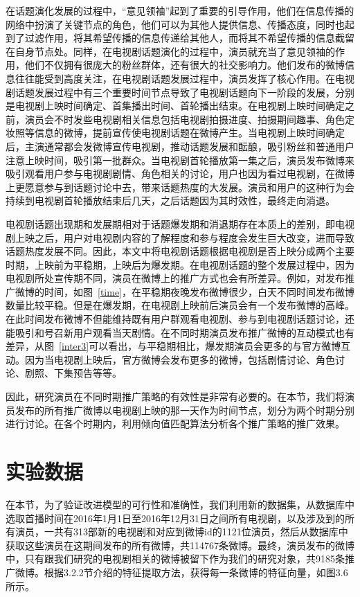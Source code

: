 在话题演化发展的过程中，“意见领袖”起到了重要的引导作用，他们在信息传播的网络中扮演了关键节点的角色，他们可以为其他人提供信息、传播态度，同时也起到了过滤作用，将其希望传播的信息传递给其他人，而将其不希望传播的信息截留在自身节点处。同样，在电视剧话题演化的过程中，演员就充当了意见领袖的作用，他们不仅拥有很庞大的粉丝群体，还有很大的社交影响力。他们发布的微博信息往往能受到高度关注，在电视剧话题发展过程中，演员发挥了核心作用。在电视剧话题发展过程中有三个重要时间节点导致了电视剧话题向下一阶段的发展，分别是电视剧上映时间确定、首集播出时间、首轮播出结束。在电视剧上映时间确定之前，演员会不时发些电视剧相关信息包括电视剧拍摄进度、拍摄期间趣事、角色定妆照等信息的微博，提前宣传使电视剧话题在微博产生。当电视剧上映时间确定后，主演通常都会发微博宣传电视剧，推动话题发展和酝酿，吸引粉丝和普通用户注意上映时间，吸引第一批群众。当电视剧首轮播放第一集之后，演员发布微博来吸引观看用户参与电视剧剧情、角色相关的讨论，用户也因为看过电视剧，在微博上更愿意参与到话题讨论中去，带来话题热度的大发展。演员和用户的这种行为会持续到电视剧首轮播放结束后几天，之后话题因为其时效性，最终走向消退。

电视剧话题出现期和发展期相对于话题爆发期和消退期存在本质上的差别，即电视剧上映之后，用户对电视剧内容的了解程度和参与程度会发生巨大改变，进而导致话题热度发展不同。因此，本文中将电视剧话题根据电视剧是否上映分成两个主要时期，上映前为平稳期，上映后为爆发期。在电视剧话题的整个发展过程中，因为电视剧所处宣传期不同，演员在微博上的推广方式也会有所差异。例如，对发布推广微博的时间，如图~\ref{time}，在平稳期夜晚发布微博很少，白天不同时间发布微博数量比较平稳。但是在爆发期，在电视剧上映前后演员会有一个发布微博的高峰。在此时间发布微博不但能维持既有用户群观看电视剧、参与到电视剧话题讨论，还能吸引和号召新用户观看当天剧情。在不同时期演员发布推广微博的互动模式也有差异，从图~\ref{inter3}可以看出，与平稳期相比，爆发期演员会更多的与官方微博互动。因为当电视剧上映后，官方微博会发布更多的微博，包括剧情讨论、角色讨论、剧照、下集预告等等。

因此，研究演员在不同时期推广策略的有效性是非常有必要的。在本节，我们将演员发布的所有推广微博以电视剧上映的那一天作为时间节点，划分为两个时期分别进行讨论。在各个时期内，利用倾向值匹配算法分析各个推广策略的推广效果。

\section{实验数据}

在本节，为了验证改进模型的可行性和准确性，我们利用新的数据集，从数据库中选取首播时间在2016年1月1日至2016年12月31日之间所有电视剧，以及涉及到的所有演员，一共有313部新的电视剧和对应到微博id的1121位演员，然后从数据库中获取这些演员在这期间发布的所有微博，共114767条微博。最终，演员发布的微博中，只有跟我们研究的电视剧相关的微博被留下作为我们的研究对象，共9185条推广微博。根据3.2.2节介绍的特征提取方法，获得每一条微博的特征向量，如图3.6所示。

